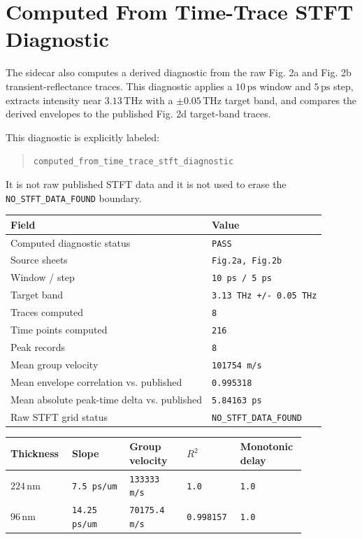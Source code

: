 \documentclass[11pt]{article}
\begin{document}
\section{Computed From Time-Trace STFT Diagnostic}

The sidecar also computes a derived diagnostic from the raw Fig. 2a and Fig. 2b
transient-reflectance traces. This diagnostic applies a \(10\,\mathrm{ps}\)
window and \(5\,\mathrm{ps}\) step, extracts intensity near
\(3.13\,\mathrm{THz}\) with a \(\pm 0.05\,\mathrm{THz}\) target band, and compares
the derived envelopes to the published Fig. 2d target-band traces.

This diagnostic is explicitly labeled:

\begin{quote}
\texttt{computed\_from\_time\_trace\_stft\_diagnostic}
\end{quote}

It is not raw published STFT data and it is not used to erase the
\texttt{NO\_STFT\_DATA\_FOUND} boundary.

\begin{center}
\begin{tabular}{ll}
\toprule
Field & Value \\
\midrule
Computed diagnostic status & \texttt{PASS} \\
Source sheets & \texttt{Fig.2a, Fig.2b} \\
Window / step & \texttt{10 ps / 5 ps} \\
Target band & \texttt{3.13 THz +/- 0.05 THz} \\
Traces computed & \texttt{8} \\
Time points computed & \texttt{216} \\
Peak records & \texttt{8} \\
Mean group velocity & \texttt{101754 m/s} \\
Mean envelope correlation vs. published & \texttt{0.995318} \\
Mean absolute peak-time delta vs. published & \texttt{5.84163 ps} \\
Raw STFT grid status & \texttt{NO\_STFT\_DATA\_FOUND} \\
\bottomrule
\end{tabular}
\end{center}

\begin{longtable}{p{0.16\linewidth}p{0.18\linewidth}p{0.18\linewidth}p{0.16\linewidth}p{0.16\linewidth}}
\toprule
Thickness & Slope & Group velocity & \(R^2\) & Monotonic delay \\
\midrule
\endhead
\(224\,\mathrm{nm}\) & \texttt{7.5 ps/um} & \texttt{133333 m/s} & \texttt{1.0} & \texttt{1.0} \\
\(96\,\mathrm{nm}\) & \texttt{14.25 ps/um} & \texttt{70175.4 m/s} & \texttt{0.998157} & \texttt{1.0} \\
\bottomrule
\end{longtable}
\end{document}

